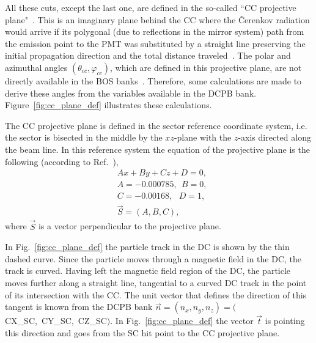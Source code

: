 All these cuts, except the last one, are defined in the so-called ``CC projective plane"~\cite{Osipenko:2004}. This is an imaginary plane behind the CC where the \v Cerenkov radiation would arrive if its polygonal (due to reflections in the mirror system) path from the emission point to the PMT was substituted by a straight line preserving the initial propagation direction and the total distance traveled~\cite{Osipenko:2004,Adams:2001kk}. The polar and azimuthal angles $(\theta_{cc},\varphi_{cc})$, which are defined in this projective plane, are not directly available in the BOS banks~\cite{BOS:bank}. Therefore, some calculations are made to derive these angles from the variables available in the DCPB bank. Figure~\ref{fig:cc_plane_def} illustrates these calculations.


The CC projective plane is defined in the sector reference coordinate system, i.e. the sector is bisected in the middle by the $xz$-plane with the $z$-axis directed along the beam line. In this reference system the equation of the projective plane is the following (according to Ref.~\cite{Osipenko:2004}),\newpage
\begin{equation}
\begin{aligned}
 &Ax+By+Cz+D = 0,  \\ \label{eq:cc_plane}
 &A=-0.000785,~~B=0,  \\
 &C=-0.00168,~~~D=1,  \\
 &\overrightarrow{S} = (A,B,C),
\end{aligned}  
\end{equation}
where $\overrightarrow{S}$ is a vector perpendicular to the projective plane.


In Fig.~\ref{fig:cc_plane_def} the particle track in the DC is shown by the thin dashed curve. Since the particle moves through a magnetic field in the DC, the track is curved. Having left the magnetic field region of the DC, the particle moves further along a straight line, tangential to a curved DC track in the point of its intersection with the CC. The unit vector that defines the direction of this tangent is known from the DCPB bank $ \overrightarrow{n} = (n_{x}, n_{y}, n_{z}) = ($CX\_SC,~CY\_SC,~CZ\_SC$)$. In Fig.~\ref{fig:cc_plane_def} the vector $ \overrightarrow{t}$ is pointing this direction and goes from the SC hit point to the CC projective plane.


